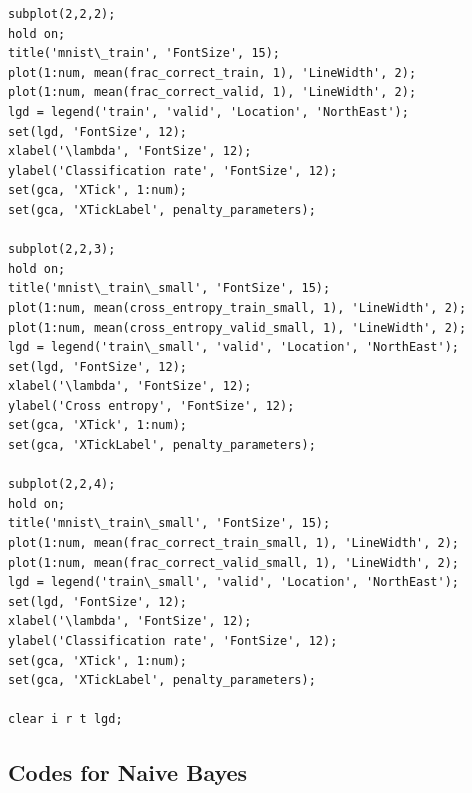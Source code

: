 \documentclass{article}
\begin{document}
\begin{lstlisting}
subplot(2,2,2);
hold on;
title('mnist\_train', 'FontSize', 15);
plot(1:num, mean(frac_correct_train, 1), 'LineWidth', 2);
plot(1:num, mean(frac_correct_valid, 1), 'LineWidth', 2);
lgd = legend('train', 'valid', 'Location', 'NorthEast');
set(lgd, 'FontSize', 12);
xlabel('\lambda', 'FontSize', 12);
ylabel('Classification rate', 'FontSize', 12);
set(gca, 'XTick', 1:num);
set(gca, 'XTickLabel', penalty_parameters);

subplot(2,2,3);
hold on;
title('mnist\_train\_small', 'FontSize', 15);
plot(1:num, mean(cross_entropy_train_small, 1), 'LineWidth', 2);
plot(1:num, mean(cross_entropy_valid_small, 1), 'LineWidth', 2);
lgd = legend('train\_small', 'valid', 'Location', 'NorthEast');
set(lgd, 'FontSize', 12);
xlabel('\lambda', 'FontSize', 12);
ylabel('Cross entropy', 'FontSize', 12);
set(gca, 'XTick', 1:num);
set(gca, 'XTickLabel', penalty_parameters);

subplot(2,2,4);
hold on;
title('mnist\_train\_small', 'FontSize', 15);
plot(1:num, mean(frac_correct_train_small, 1), 'LineWidth', 2);
plot(1:num, mean(frac_correct_valid_small, 1), 'LineWidth', 2);
lgd = legend('train\_small', 'valid', 'Location', 'NorthEast');
set(lgd, 'FontSize', 12);
xlabel('\lambda', 'FontSize', 12);
ylabel('Classification rate', 'FontSize', 12);
set(gca, 'XTick', 1:num);
set(gca, 'XTickLabel', penalty_parameters);

clear i r t lgd;
\end{lstlisting}

\subsection{Codes for Naive Bayes}
\end{document}
